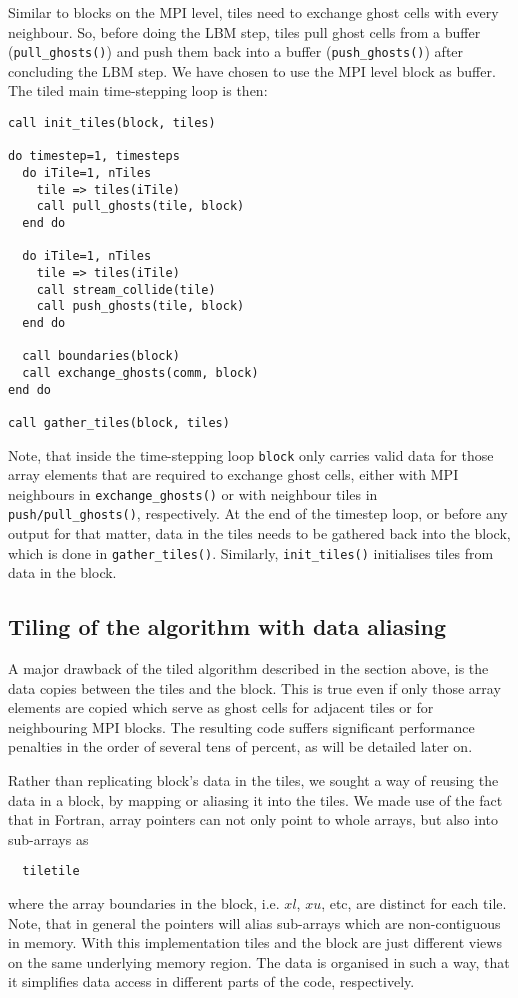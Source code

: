 \documentclass[conference]{IEEEtran}
\begin{document}
Similar to blocks on the MPI level, tiles need to exchange ghost
cells with every neighbour. So, before doing the LBM step, tiles pull
ghost cells from a buffer (\verb!pull_ghosts()!) and push them back into a
buffer (\verb!push_ghosts()!) after concluding the LBM step. We have chosen to use the MPI
level block as buffer. The tiled main time-stepping loop is then:
\begin{lstlisting}
call init_tiles(block, tiles)

do timestep=1, timesteps
  do iTile=1, nTiles
    tile => tiles(iTile)
    call pull_ghosts(tile, block)
  end do

  do iTile=1, nTiles
    tile => tiles(iTile)
    call stream_collide(tile)
    call push_ghosts(tile, block)
  end do

  call boundaries(block)
  call exchange_ghosts(comm, block)
end do

call gather_tiles(block, tiles)
\end{lstlisting}
Note, that inside the time-stepping loop \verb!block! only carries
 valid data for those array elements that are required to exchange ghost
 cells, either with MPI neighbours in \verb!exchange_ghosts()! or with
 neighbour tiles in \verb!push/pull_ghosts()!, respectively. At the end
 of the timestep loop, or before any output for that matter, data in the tiles
 needs to be gathered back into the block, which is done in
 \verb!gather_tiles()!. Similarly,  \verb!init_tiles()! initialises
 tiles from data in the block.

\subsection{Tiling of the algorithm with data
  aliasing} \label{sec:aliasing}

A major drawback of the tiled algorithm described in the section
above, is the data copies between the tiles and the block. This is true even if
only those array elements are copied which serve as ghost cells for adjacent
tiles or for neighbouring MPI blocks. The resulting code suffers
significant performance penalties in the order of several tens of
percent, as will be detailed later on.

Rather than replicating block's data in the tiles, we sought a way of
reusing the data in a block, by mapping or aliasing it into the tiles. 
We made use of the fact that in Fortran, array pointers can not only point to whole
arrays, but also into sub-arrays as
\begin{lstlisting}
  tiletile\end{lstlisting}
where the array boundaries in the block, i.e. $xl$, $xu$, etc, are
distinct for each tile.  Note, that in general the pointers will alias
sub-arrays which are non-contiguous in memory. With this
implementation tiles and the block are just different views on the
same underlying memory region. The data is organised in such a way, that
it simplifies data access in different parts of the code, respectively.
\end{document}
